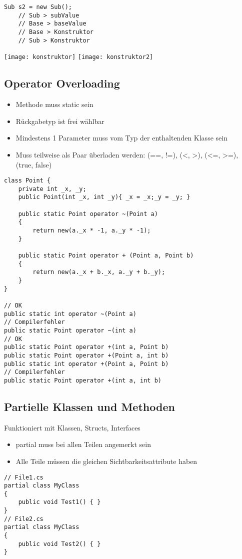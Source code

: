 \begin{multicols*}{2}
\begin{lstlisting}
Sub s2 = new Sub();
    // Sub > subValue
    // Base > baseValue 
    // Base > Konstruktor 
    // Sub > Konstruktor
\end{lstlisting}
\texttt{[image: konstruktor]}
\texttt{[image: konstruktor2]}

\subsection{Operator Overloading}
\begin{itemize}
    \item Methode muss static sein
    \item Rückgabetyp ist frei wählbar
    \item Mindestens 1 Parameter muss vom Typ der enthaltenden Klasse sein
    \item Muss teilweise als Paar überladen werden:
    (==, !=), (<, >), (<=, >=), (true, false)
\end{itemize}
\begin{lstlisting}
class Point {
    private int _x, _y;
    public Point(int _x, int _y){ _x = _x;_y = _y; }

    public static Point operator ~(Point a) 
    {
        return new(a._x * -1, a._y * -1);
    }

    public static Point operator + (Point a, Point b)
    {
        return new(a._x + b._x, a._y + b._y);
    } 
}

// OK
public static int operator ~(Point a)
// Compilerfehler
public static Point operator ~(int a)
// OK
public static Point operator +(int a, Point b) 
public static Point operator +(Point a, int b) 
public static int operator +(Point a, Point b) 
// Compilerfehler
public static Point operator +(int a, int b)
\end{lstlisting}

\subsection{Partielle Klassen und Methoden}
Funktioniert mit Klassen, Structs, Interfaces
\begin{itemize}
    \item partial muss bei allen Teilen angemerkt sein
    \item Alle Teile müssen die gleichen Sichtbarkeitsattribute haben
\end{itemize}
\begin{lstlisting}
// File1.cs
partial class MyClass
{
    public void Test1() { }
}
// File2.cs
partial class MyClass
{
    public void Test2() { }
}
\end{lstlisting}
\end{multicols*}
